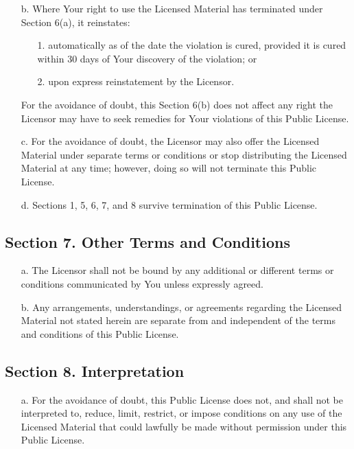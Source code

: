 \begin{scriptsize}
\begin{itemize}
\item[b.] Where Your right to use the Licensed Material has terminated under
     Section 6(a), it reinstates:

	\begin{itemize}
    \item[1.] automatically as of the date the violation is cured, provided
          it is cured within 30 days of Your discovery of the
          violation; or

    \item[2.] upon express reinstatement by the Licensor.
	\end{itemize}

     For the avoidance of doubt, this Section 6(b) does not affect any
     right the Licensor may have to seek remedies for Your violations
     of this Public License.

\item[c.] For the avoidance of doubt, the Licensor may also offer the
     Licensed Material under separate terms or conditions or stop
     distributing the Licensed Material at any time; however, doing so
     will not terminate this Public License.

\item[d.] Sections 1, 5, 6, 7, and 8 survive termination of this Public
     License.
\end{itemize}


\subsection*{Section 7. Other Terms and Conditions}

\begin{itemize}
\item[a.] The Licensor shall not be bound by any additional or different
     terms or conditions communicated by You unless expressly agreed.

\item[b.] Any arrangements, understandings, or agreements regarding the
     Licensed Material not stated herein are separate from and
     independent of the terms and conditions of this Public License.
\end{itemize}

\subsection*{Section 8. Interpretation}

\begin{itemize}
\item[a.] For the avoidance of doubt, this Public License does not, and
     shall not be interpreted to, reduce, limit, restrict, or impose
     conditions on any use of the Licensed Material that could lawfully
     be made without permission under this Public License.


\end{itemize}
\end{scriptsize}
